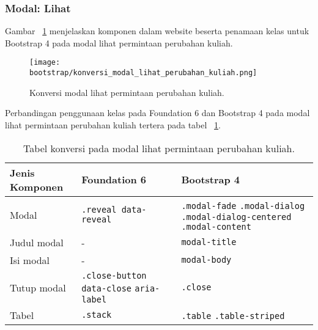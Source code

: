\subsubsection{Modal: Lihat}

\noindent Gambar ~\ref{fig:konversiLihatPermintaanPerubahanKuliah} menjelaskan komponen dalam website beserta penamaan kelas untuk Bootstrap 4 pada modal lihat permintaan perubahan kuliah.\\
\begin{figure} [H]
	\centering  
	\texttt{[image: bootstrap/konversi\_modal\_lihat\_perubahan\_kuliah.png]}
	\caption{Konversi modal lihat permintaan perubahan kuliah.}
	\label{fig:konversiLihatPermintaanPerubahanKuliah}
\end{figure}

\noindent Perbandingan penggunaan kelas pada Foundation 6 dan Bootstrap 4 pada modal lihat permintaan perubahan kuliah tertera pada tabel ~\ref{table:konversiLihatPermintaanPerubahanKuliah}.\\
\begin{table}[H]
	\caption{Tabel konversi pada modal lihat permintaan perubahan kuliah.}
	\begin{tabular}{| p{} | p{} | p{} |} 
		\hline
		\textbf{Jenis Komponen} & \textbf{Foundation 6} & \textbf{Bootstrap 4}  \\ [0.5ex] 
		\hline	
		Modal & \texttt{.reveal data-reveal} & \texttt{.modal-fade} \newline \texttt{.modal-dialog} \newline \texttt{.modal-dialog-centered} \newline \texttt{.modal-content} \\
		\hline
		Judul modal & - & \texttt{modal-title}\\
		\hline
		Isi modal & - & \texttt{modal-body}\\
		\hline
		Tutup modal & \texttt{.close-button} \newline \texttt{data-close} \newline \texttt{aria-label} & \texttt{.close}\\
		\hline	
		Tabel & \texttt{.stack} & \texttt{.table} \newline \texttt{.table-striped} \\[1ex]
		\hline
	\end{tabular}
	\label{table:konversiLihatPermintaanPerubahanKuliah}
\end{table}



